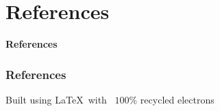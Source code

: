 \documentclass[12pt,landscape]{beamer}
\begin{document}
\section{References}

\begin{frame}
 \textbf{References}
\end{frame}

\begin{frame}[allowframebreaks]
 \frametitle{References}
 
 
\end{frame}

\begin{frame}
  \tiny
  Built using \LaTeX\ with \ $100\%$ recycled electrons
\end{frame}
\end{document}
